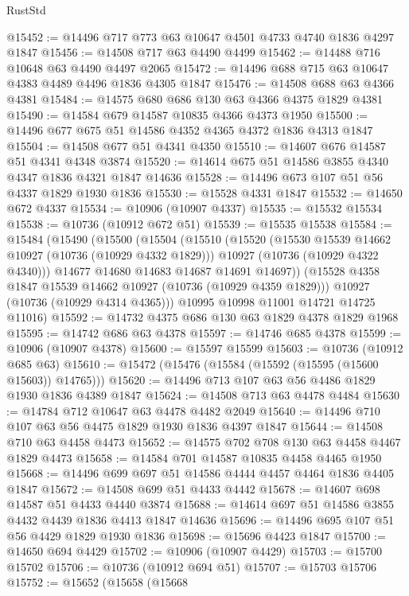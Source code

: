 \begin{lexlean}{RustStd}
\begin{coremodule}
@15452 := @14496 @717 @773 @63 @10647 @4501 @4733 @4740 @1836 @4297 @1847
@15456 := @14508 @717 @63 @4490 @4499
@15462 := @14488 @716 @10648 @63 @4490 @4497 @2065
@15472 := @14496 @688 @715 @63 @10647 @4383 @4489 @4496 @1836 @4305 @1847
@15476 := @14508 @688 @63 @4366 @4381
@15484 := @14575 @680 @686 @130 @63 @4366 @4375 @1829 @4381
@15490 := @14584 @679 @14587 @10835 @4366 @4373 @1950
@15500 := @14496 @677 @675 @51 @14586 @4352 @4365 @4372 @1836 @4313 @1847
@15504 := @14508 @677 @51 @4341 @4350
@15510 := @14607 @676 @14587 @51 @4341 @4348 @3874
@15520 := @14614 @675 @51 @14586 @3855 @4340 @4347 @1836 @4321 @1847 @14636
@15528 := @14496 @673 @107 @51 @56 @4337 @1829 @1930 @1836
@15530 := @15528 @4331 @1847
@15532 := @14650 @672 @4337
@15534 := @10906 (@10907 @4337)
@15535 := @15532 @15534
@15538 := @10736 (@10912 @672 @51)
@15539 := @15535 @15538
@15584 := @15484
    (@15490
      (@15500
        (@15504
          (@15510
            (@15520
              (@15530 @15539 @14662 @10927 (@10736 (@10929 @4332 @1829)))
              @10927
              (@10736 (@10929 @4322 @4340)))
            @14677
            @14680
            @14683
            @14687
            @14691
            @14697))
        (@15528 @4358 @1847 @15539 @14662 @10927 (@10736 (@10929 @4359 @1829)))
        @10927
        (@10736 (@10929 @4314 @4365)))
      @10995
      @10998
      @11001
      @14721
      @14725
      @11016)
@15592 := @14732 @4375 @686 @130 @63 @1829 @4378 @1829 @1968
@15595 := @14742 @686 @63 @4378
@15597 := @14746 @685 @4378
@15599 := @10906 (@10907 @4378)
@15600 := @15597 @15599
@15603 := @10736 (@10912 @685 @63)
@15610 := @15472 (@15476 (@15584 (@15592 (@15595 (@15600 @15603)) @14765)))
@15620 := @14496 @713 @107 @63 @56 @4486 @1829 @1930 @1836 @4389 @1847
@15624 := @14508 @713 @63 @4478 @4484
@15630 := @14784 @712 @10647 @63 @4478 @4482 @2049
@15640 := @14496 @710 @107 @63 @56 @4475 @1829 @1930 @1836 @4397 @1847
@15644 := @14508 @710 @63 @4458 @4473
@15652 := @14575 @702 @708 @130 @63 @4458 @4467 @1829 @4473
@15658 := @14584 @701 @14587 @10835 @4458 @4465 @1950
@15668 := @14496 @699 @697 @51 @14586 @4444 @4457 @4464 @1836 @4405 @1847
@15672 := @14508 @699 @51 @4433 @4442
@15678 := @14607 @698 @14587 @51 @4433 @4440 @3874
@15688 := @14614 @697 @51 @14586 @3855 @4432 @4439 @1836 @4413 @1847 @14636
@15696 := @14496 @695 @107 @51 @56 @4429 @1829 @1930 @1836
@15698 := @15696 @4423 @1847
@15700 := @14650 @694 @4429
@15702 := @10906 (@10907 @4429)
@15703 := @15700 @15702
@15706 := @10736 (@10912 @694 @51)
@15707 := @15703 @15706
@15752 := @15652
    (@15658
      (@15668

\end{coremodule}
\end{lexlean}
